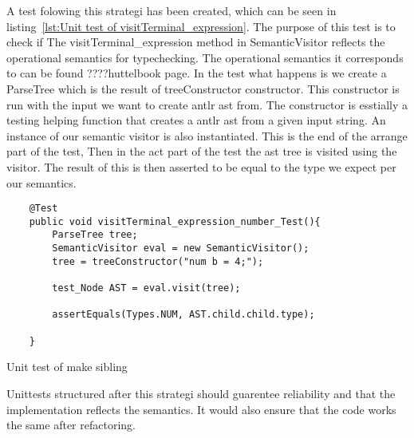 A test folowing this strategi has been created, which can be seen in listing~\ref{lst:Unit test of visitTerminal_expression}. The purpose of this test is to check if The visitTerminal_expression method in SemanticVisitor reflects the operational semantics for typechecking. The operational semantics it corresponds to can be found ????huttelbook page. In the test what happens is we create a ParseTree which is the result of treeConstructor constructor. This constructor is run with the input we want to create antlr ast from. The constructor is esstially a testing helping function that creates a antlr ast from a given input string. An instance of our semantic visitor is also instantiated. This is the end of the arrange part of the test, Then in the act part of the test the ast tree is visited using the visitor. The result of this is then asserted to be equal to the type we expect per our semantics.
\begin{listing}[htb!]
    \begin{verbatim}
    @Test
    public void visitTerminal_expression_number_Test(){
        ParseTree tree;
        SemanticVisitor eval = new SemanticVisitor();
        tree = treeConstructor("num b = 4;");

        test_Node AST = eval.visit(tree);

        assertEquals(Types.NUM, AST.child.child.type);
        
    }
    \end{verbatim}
    \caption{Unit test of make sibling}
    \label{lst:unit test of make sibling}
\end{listing}

Unittests structured after this strategi should guarentee reliability and that the implementation reflects the semantics.
It would also ensure  that the code works the same after refactoring.
